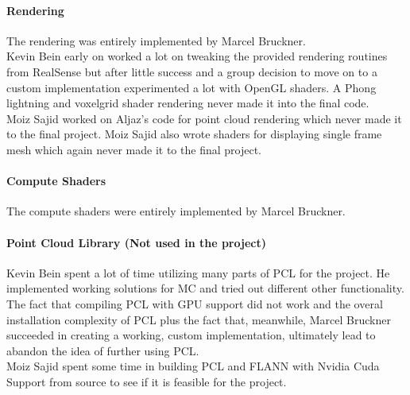 \documentclass[10pt,twocolumn,letterpaper]{article}
\begin{document}
\paragraph{Rendering}
The rendering was entirely implemented by Marcel Bruckner.\\
Kevin Bein early on worked a lot on tweaking the provided rendering routines from RealSense but after little success and a group decision to move on to a custom implementation experimented a lot with OpenGL shaders. A Phong lightning and voxelgrid shader rendering never made it into the final code. \\
Moiz Sajid worked on Aljaz's code for point cloud rendering which never made it to the final project. Moiz Sajid also wrote shaders for displaying single frame mesh which again never made it to the final project. 

\paragraph{Compute Shaders}
The compute shaders were entirely implemented by Marcel Bruckner.

\paragraph{Point Cloud Library (Not used in the project)}
Kevin Bein spent a lot of time utilizing many parts of PCL for the project. He implemented working solutions for MC and tried out different other functionality. The fact that compiling PCL with GPU support did not work and the overal installation complexity of PCL plus the fact that, meanwhile, Marcel Bruckner succeeded in creating a working, custom implementation, ultimately lead to abandon the idea of further using PCL. \\
Moiz Sajid spent some time in building PCL and FLANN with Nvidia Cuda Support from source to see if it is feasible for the project.


\clearpage

{\small


}
\end{document}
